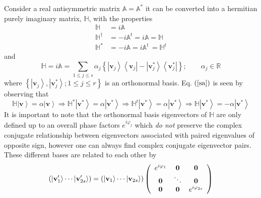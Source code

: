 \documentclass[aps,preprint]{revtex4}%
\begin{document}
Consider a real antisymmetric\emph{ }matrix $\mathbb{A}=\mathbb{A}^{\ast}$ it
can be converted into a hermitian purely imaginary matrix, $\mathbb{H}$, with
the properties
\begin{align}
\mathbb{H} &  =i\mathbb{A}\nonumber\\
\mathbb{H}^{\dagger} &  =-i\mathbb{A}^{t}=i\mathbb{A}=\mathbb{H}\nonumber\\
\mathbb{H}^{\ast} &  =-i\mathbb{A}=i\mathbb{A}^{t}\,=\mathbb{H}^{t}%
\end{align}
and
\begin{equation}
\mathbb{H}=i\mathbb{A}=\sum_{1\leq j\leq s}\alpha_{j}\left\{  \left\vert
\mathbf{v}_{j}\right\rangle \left\langle \mathbf{v}_{j}\right\vert -\left\vert
\mathbf{v}_{j}^{\ast}\right\rangle \left\langle \mathbf{v}_{j}^{\ast
}\right\vert \right\}  ;\qquad\alpha_{j}\in\mathbb{R}\label{sa}%
\end{equation}
where $\left\{  \left\vert \mathbf{v}_{j}\right\rangle ,\left\vert
\mathbf{v}_{j}^{\ast}\right\rangle ;1\leq j\leq r\right\}  $ is an orthonormal
basis. Eq. $\left(  \ref{sa}\right)  $ is seen by observing that
\begin{equation}
\mathbb{H}\left\vert \mathbf{v}\right\rangle =\alpha\left\vert \mathbf{v}%
\right\rangle \Rightarrow\mathbb{H}^{\ast}\left\vert \mathbf{v}^{\ast
}\right\rangle =\alpha\left\vert \mathbf{v}^{\ast}\right\rangle \Rightarrow
\mathbb{H}^{t}\left\vert \mathbf{v}^{\ast}\right\rangle =\alpha\left\vert
\mathbf{v}^{\ast}\right\rangle \Rightarrow\mathbb{H}\left\vert \mathbf{v}%
^{\ast}\right\rangle =-\alpha\left\vert \mathbf{v}^{\ast}\right\rangle
\end{equation}
It is important to note that the orthonormal basis eigenvectors of
$\mathbb{H}$ are only defined up to an overall phase factors $e^{i\varphi_{j}%
}$ which \emph{do not} preserve the complex conjugate relationship between
eigenvectors associated with paired eigenvalues of opposite sign, however one
can always find complex conjugate eigenvector pairs. These different bases are
related to each other by
\begin{equation}
\left(  \left\vert \mathbf{v}_{1}^{\prime}\right\rangle \cdots\left\vert
\mathbf{v}_{2s}^{\prime}\right\rangle \right)  =\left(  \left\vert
\mathbf{v}_{1}\right\rangle \cdots\left\vert \mathbf{v}_{2s}\right\rangle
\right)  \left(
\begin{array}
[c]{ccc}%
e^{i\varphi_{1}} & \mathbf{0} & \mathbf{0}\\
\mathbf{0} & \ddots & \mathbf{0}\\
\mathbf{0} & \mathbf{0} & e^{i\varphi_{2s}}%
\end{array}
\right)
\end{equation}
\end{document}
